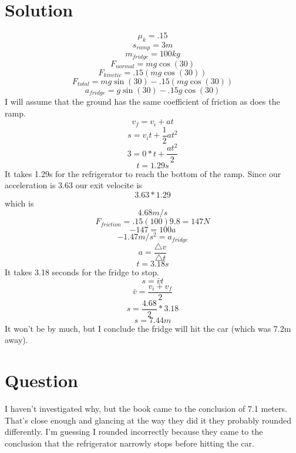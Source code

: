\documentclass{article}
\begin{document}
\section{Solution}
\[ \mu_k = .15 \]
\[ s_{ramp}=3m \]
\[ m_{fridge}=100kg \]
\[ F_{normal}=mg\cos(30) \]
\[ F_{kinetic}=.15(mg\cos(30)) \]
\[ F_{total}=mg\sin(30)-.15(mg\cos(30)) \]
\[ a_{fridge}=g\sin(30)-.15g\cos(30) \]
I will assume that the ground has the same coefficient of friction as does the ramp.
\[  v_f=v_i+at \]
\[ s=v_it+\frac{1}{2}at^2 \]
\[ 3=0*t+\frac{at^2}{2} \]
\[ t=1.29s \]
It takes 1.29s for the refrigerator to reach the bottom of the ramp. Since our acceleration is 3.63 our exit velocite is \[ 3.63*1.29 \] which is \[ 4.68m/s \]
\[ F_{friction}=.15(100)9.8=147N \]
\[ -147=100a \]
\[ -1.47m/s^2=a_{fridge} \]
\[ a=\frac{\triangle{v}}{\triangle{t}} \]
\[ t=3.18s \]
It takes 3.18 seconds for the fridge to stop.
\[ s=\bar{v}t \]
\[ \bar{v} = \frac{v_i+v_f}{2} \]
\[ s=\frac{4.68}{2}*3.18 \]
\[ s=7.44m \]
It won't be by much, but I conclude the fridge will hit the car (which was 7.2m away).
\section{Question}
I haven't investigated why, but the book came to the conclusion of 7.1 meters. That's close enough and glancing at the way they did it they probably rounded differently. I'm guessing I rounded incorrectly because they came to the conclusion that the refrigerator narrowly stops before hitting the car.
\end{document}
